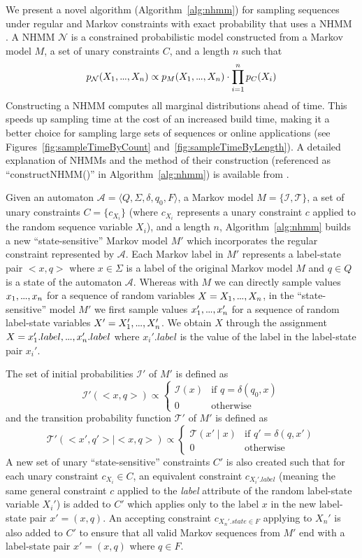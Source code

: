 \documentclass[phd,electronic,oneside,twosidetoc,letterpaper,chaptercenter,parttop,lol,lof,lot]{byumsphd}
\newcommand\mydots{\hbox to .75em{.\hss.\hss.}}
\begin{document}
We present a novel algorithm (Algorithm~\ref{alg:nhmm}) for sampling sequences under regular and Markov constraints with exact probability that uses a NHMM \cite{pachet2011finite}. A NHMM $\mathcal{N}$ is a constrained probabilistic model constructed from a Markov model $M$, a set of unary constraints $C$, and a length $n$ such that 
\[
  p_\mathcal{N}(X_1,\mydots,X_n) \propto   
	p_M(X_1,\mydots,X_n)\cdot\prod_{i=1}^n p_C(X_i)\\
\]
Constructing a NHMM computes all marginal distributions ahead of time. This speeds up sampling time at the cost of an increased build time, making it a better choice for sampling large sets of sequences or online applications (see Figures~\ref{fig:sampleTimeByCount} and~\ref{fig:sampleTimeByLength}). A detailed explanation of NHMMs and the method of their construction (referenced as ``constructNHMM()'' in Algorithm~\ref{alg:nhmm}) is available from \cite{pachet2011finite}.

Given an automaton $\mathcal{A}=\langle Q, \Sigma, \delta, q_0, F \rangle$, a Markov model $M=\{\mathcal{I},\mathcal{T}\}$, a set of unary constraints $C=\{c_{X_i}\}$ (where $c_{X_i}$ represents a unary constraint $c$ applied to the random sequence variable $X_i$), and a length $n$, Algorithm~\ref{alg:nhmm} builds a new ``state-sensitive'' Markov model $M'$ which incorporates the regular constraint represented by $\mathcal{A}$. Each Markov label in $M'$ represents a label-state pair $<x,q>$ where $x\in\Sigma$ is a label of the original Markov model $M$ and $q\in Q$ is a state of the automaton $\mathcal{A}$. Whereas with $M$ we can directly sample values $x_1,\mydots,x_n$ for a sequence of random variables $X=X_1,\mydots,X_n$, in the ``state-sensitive'' model $M'$ we first sample values $x_1',\mydots,x_n'$  for a sequence of random label-state variables $X'=X_1',\mydots,X_n'$. We obtain $X$ through the assignment $X=x_1'.label,\mydots,x_n'.label$ where $x_i'.label$ is the value of the label in the label-state pair $x_i'$.

The set of initial probabilities $\mathcal{I}'$ of $M'$ is defined as
\[
  \mathcal{I}'(<x,q>) \propto
  \begin{cases}
	\mathcal{I}(x) & \text{if } q = \delta(q_0,x)\\
	0 & \text{otherwise}
  \end{cases}
\]
\noindent and the transition probability function $\mathcal{T}'$ of $M'$ is defined as
\[
  \mathcal{T}'(<x',q'>\mid <x,q>) \propto   
  \begin{cases}
	\mathcal{T}(x'\mid x) & \text{if } q'=\delta(q,x')\\
	0 & \text{otherwise}
  \end{cases}
\]
A new set of unary ``state-sensitive'' constraints $C'$ is also created such that for each unary constraint $c_{X_i} \in C$, an equivalent constraint $c_{X_i'.label}$ (meaning the same general constraint $c$ applied to the \textit{label} attribute of the random label-state variable $X_i'$) is added to $C'$ which applies only to the label $x$ in the new label-state pair $x'=(x,q)$. An {\sc accepting} constraint $c_{X_n'.state\in F}$ applying to $X_n'$ is also added to $C'$ to ensure that all valid Markov sequences from $M'$ end with a label-state pair $x'=(x,q)$ where $q\in F$.
\end{document}
